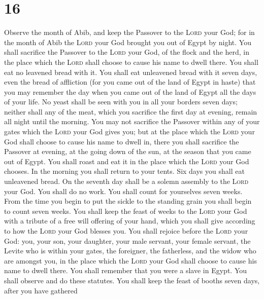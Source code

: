 \hypertarget{section-15}{%
\section{16}\label{section-15}}

 Observe the month of Abib, and keep the Passover to the
\textsc{Lord} your God; for in the month of Abib the \textsc{Lord} your
God brought you out of Egypt by night.  You shall
sacrifice the Passover to the \textsc{Lord} your God, of the flock and
the herd, in the place which the \textsc{Lord} shall choose to cause his
name to dwell there.  You shall eat no leavened bread with
it. You shall eat unleavened bread with it seven days, even the bread of
affliction (for you came out of the land of Egypt in haste) that you may
remember the day when you came out of the land of Egypt all the days of
your life.  No yeast shall be seen with you in all your
borders seven days; neither shall any of the meat, which you sacrifice
the first day at evening, remain all night until the morning.
 You may not sacrifice the Passover within any of your
gates which the \textsc{Lord} your God gives you;  but at
the place which the \textsc{Lord} your God shall choose to cause his
name to dwell in, there you shall sacrifice the Passover at evening, at
the going down of the sun, at the season that you came out of Egypt.
 You shall roast and eat it in the place which the
\textsc{Lord} your God chooses. In the morning you shall return to your
tents.  Six days you shall eat unleavened bread. On the
seventh day shall be a solemn assembly to the \textsc{Lord} your God.
You shall do no work.  You shall count for yourselves
seven weeks. From the time you begin to put the sickle to the standing
grain you shall begin to count seven weeks.  You shall
keep the feast of weeks to the \textsc{Lord} your God with a tribute of
a free will offering of your hand, which you shall give according to how
the \textsc{Lord} your God blesses you.  You shall
rejoice before the \textsc{Lord} your God: you, your son, your daughter,
your male servant, your female servant, the Levite who is within your
gates, the foreigner, the fatherless, and the widow who are amongst you,
in the place which the \textsc{Lord} your God shall choose to cause his
name to dwell there.  You shall remember that you were a
slave in Egypt. You shall observe and do these statutes. 
You shall keep the feast of booths seven days, after you have gathered
